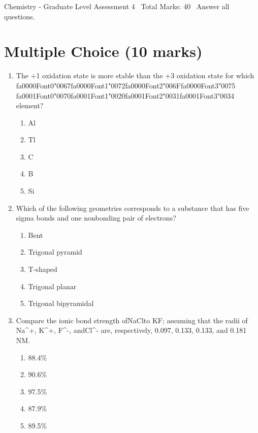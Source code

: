\documentclass[12pt]{article}
\begin{document}
\begin{center}
Chemistry - Graduate Level Assessment 4 \
Total Marks: 40 \
Answer all questions.
\end{center}

\section*{Multiple Choice (10 marks)}
\begin{enumerate}[label=\arabic*.]
\item The +1 oxidation state is more stable than the +3 oxidation state for which {\csname fa0000Font0\endcsname\char"0067}{\csname fa0000Font1\endcsname\char"0072}{\csname fa0000Font2\endcsname\char"006F}{\csname fa0000Font3\endcsname\char"0075} {\csname fa0001Font0\endcsname\char"0070}{\csname fa0001Font1\endcsname\char"0020}{\csname fa0001Font2\endcsname\char"0031}{\csname fa0001Font3\endcsname\char"0034}
element?
\begin{enumerate}[label=(\alph*)]
    \item Al
    \item Tl
    \item C
    \item B
    \item Si
\end{enumerate}
\item Which of the following geometries corresponds to a substance that has five sigma bonds and
one nonbonding pair of electrons?
\begin{enumerate}[label=(\alph*)]
    \item Bent
    \item Trigonal pyramid
    \item T-shaped
    \item Trigonal planar
    \item Trigonal bipyramidal
\end{enumerate}
\item Compare the ionic bond strength ofNaClto KF; assuming that the radii of Na\^{}+, K\^{}+, F\^{}-,
andCl\^{}- are, respectively, 0.097, 0.133, 0.133, and 0.181 NM.
\begin{enumerate}[label=(\alph*)]
    \item 88.4\%
    \item 90.6\%
    \item 97.5\%
    \item 87.9\%
    \item 89.5\%
\end{enumerate}

\end{enumerate}
\end{document}
